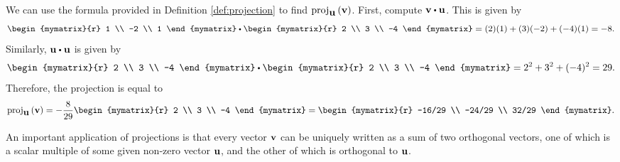 \begin{solution}
  We can use the formula provided in Definition \ref{def:projection}
  to find $\mbox{\rm proj}_{\mbox{\bf u}}\left(\mbox{\bf v}\right)$.  First, compute
  $\vect{v} \dotprod \vect{u}$.  This is given by
  \begin{equation*}
    \begin{mymatrix}{r}
      1 \\
      -2 \\
      1
    \end{mymatrix}
    \dotprod
    \begin{mymatrix}{r}
      2 \\
      3 \\
      -4
    \end{mymatrix}
    = (2)(1) + (3)(-2) + (-4)(1)
    = -8.
   \end{equation*}
   Similarly, $\vect{u} \dotprod \vect{u}$ is given by 
   \begin{equation*}
     \begin{mymatrix}{r}
       2 \\
       3 \\
       -4 
     \end{mymatrix}
     \dotprod
     \begin{mymatrix}{r}
       2 \\
       3 \\
       -4
     \end{mymatrix}
     = 2^2 + 3^2 + (-4)^2
     = 29.
  \end{equation*}
  Therefore, the projection is equal to  
  \begin{equation*}
    \func{proj}_{\vect{u}}\tup{\vect{v}}
    =-\frac{8}{29} 
        \begin{mymatrix}{r}
          2 \\
          3 \\
          -4
        \end{mymatrix}
    = 
        \begin{mymatrix}{r}
          -16/29 \\
          -24/29 \\
          32/29
        \end{mymatrix}.
  \end{equation*}
\end{solution}

An important application of projections is that every vector
$\mbox{\bf v}$ can be uniquely written as a sum of two orthogonal vectors,
one of which is a scalar multiple of some given non-zero vector
$\mbox{\bf u}$, and the other of which is orthogonal to $\mbox{\bf u}$.

